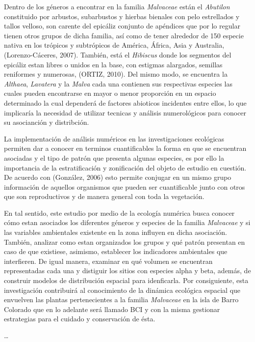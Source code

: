\documentclass[11pt,]{article}
\begin{document}
Dentro de los géneros a encontrar en la familia \emph{Malvaceae} están
el \emph{Abutilon} constituido por arbustos, subarbustos y hierbas
bienales con pelo estrellados y tallos velloso, son carente del epicáliz
conjunto de apéndices que por lo regular tienen otros grupos de dicha
familia, así como de tener alrededor de 150 especie nativa en los
trópicos y subtrópicos de América, África, Asia y Australia,
(Lorenzo-Cáceres, 2007). También, está el \emph{Hibiscus} donde los
segmentos del epicáliz estan libres o unidos en la base, con estigmas
alargados, semillas reniformes y numerosas, (ORTIZ, 2010). Del mismo
modo, se encuentra la \emph{Althaea}, \emph{Lavatera} y la \emph{Malva}
cada una contienen sus respectivas especies las cuales pueden
encontrarse en mayor o menor proporción en un espacio determinado la
cual dependerá de factores abioticos incidentes entre ellos, lo que
implicaría la necesidad de utilizar tecnicas y análisis numerológicos
para conocer su asocianción y distribción.

La implementación de análisis numéricos en las investigaciones
ecológicas permiten dar a conocer en terminos cuantificables la forma en
que se encuentran asociadas y el tipo de patrón que presenta algunas
especies, es por ello la importancia de la estratificación y
zonificación del objeto de estudio en cuestión. De acuerdo con
(González, 2006) esto permite conjugar en un mismo grupo información de
aquellos organismos que pueden ser cuantificable junto con otros que son
reproductivos y de manera general con toda la vegetación.

En tal sentido, este estudio por medio de la ecología numérica busca
conocer cómo estan asociados los diferentes géneros y especies de la
familia \emph{Malvaceae} y si las variables ambientales existente en la
zona influyen en dicha asociación. También, analizar como estan
organizados los grupos y qué patrón presentan en caso de que existiese,
asimismo, establecer los indicadores ambientales que interfieren. De
igual manera, examinar en qué volumen se encuentran representadas cada
una y distiguir los sitios con especies alpha y beta, además, de
construir modelos de distribución espacial para idenficarla. Por
consiguiente, esta investigación contribuirá al conocimiento de la
dinámica ecológica espacial que envuelven las plantas pertenecientes a
la familia \emph{Malvaceae} en la isla de Barro Colorado que en lo
adelante será llamado BCI y con la misma gestionar estrategias para el
cuidado y conservación de ésta.

\ldots
\end{document}
